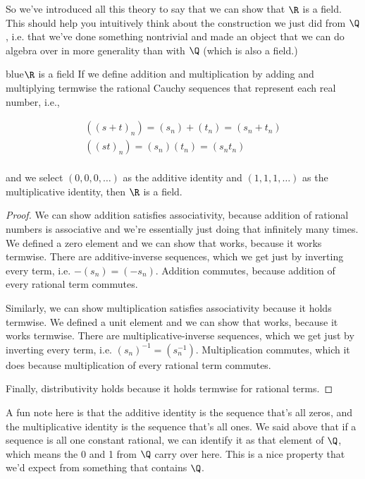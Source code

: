 \documentclass[./analysis.tex]{subfiles}
\begin{document}
    So we've introduced all this theory to say that we can show that $\R$ is a field. This should help you intuitively think about the construction we just did from $\Q$, i.e. that we've done something nontrivial and made an object that we can do algebra over in more generality than with $\Q$ (which is also a field.) 

    \begin{mycolorbox}{blue}{$\R$ is a field} If we define addition and multiplication by adding and multiplying termwise the rational Cauchy sequences that represent each real number, i.e., 

    \begin{align*}
        ((s + t)_n) = (s_n) + (t_n) = (s_n + t_n)\\
        ((st)_n) = (s_n) (t_n) = (s_n t_n)\\
    \end{align*}

    and we select $(0, 0, 0, \dots)$ as the additive identity and $(1, 1, 1, \dots)$ as the multiplicative identity, then $\R$ is a field. \end{mycolorbox}
    \begin{proof}    
    We can show addition satisfies associativity, because addition of rational numbers is associative and we're essentially just doing that infinitely many times. We defined a zero element and we can show that works, because it works termwise. There are additive-inverse sequences, which we get just by inverting every term, i.e. $-(s_n) = (-s_n)$. Addition commutes, because addition of every rational term commutes. 

    Similarly, we can show multiplication satisfies associativity because it holds termwise. We defined a unit element and we can show that works, because it works termwise. There are multiplicative-inverse sequences, which we get just by inverting every term, i.e. $(s_n)^{-1} = (s_n^{-1})$. Multiplication commutes, which it does because multiplication of every rational term commutes.

    Finally, distributivity holds because it holds termwise for rational terms.
    \end{proof}

    A fun note here is that the additive identity is the sequence that's all zeros, and the multiplicative identity is the sequence that's all ones. We said above that if a sequence is all one constant rational, we can identify it as that element of $\Q$, which means the 0 and 1 from $\Q$ carry over here. This is a nice property that we'd expect from something that contains $\Q$.
\end{document}
